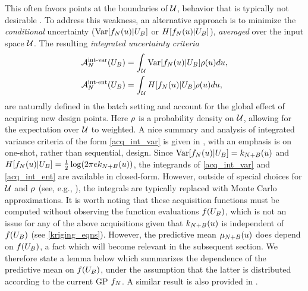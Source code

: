 \documentclass[12pt]{article}
\begin{document}
This often favors points at the boundaries of $\parSpace$, behavior that is typically not desirable \cite{gramacy2020surrogates}. 
To address this weakness, an alternative approach is to minimize the \textit{conditional} uncertainty 
($\Var[\funcEm[\Ndesign](\Par) | \designBatchIn]$ or $\Ent[\funcEm[\Ndesign](\Par) | \designBatchIn]$), \textit{averaged} over 
the input space $\parSpace$. The resulting \textit{integrated uncertainty criteria}
\begin{align}
\labelAcq[\Ndesign]{\intvarLabel}(\designBatchIn)
&= \int_{\parSpace} \Var[\funcEm[\Ndesign](\Par) | \designBatchIn] \weightDens(\Par) d\Par, \label{acq_int_var} \\ 
\labelAcq[\Ndesign]{\intentLabel}(\designBatchIn)
&= \int_{\parSpace} \Ent[\funcEm[\Ndesign](\Par) | \designBatchIn] \weightDens(\Par) d\Par, \label{acq_int_ent}
\end{align}
are naturally defined in the batch setting and account for the global effect of acquiring new design points. Here $\weightDens$ is 
a probability density on $\parSpace$, allowing for the expectation over $\parSpace$ to weighted. 
A nice summary and analysis of integrated variance criteria of the form \ref{acq_int_var} is given 
in \cite{Mercer_kernels_IVAR}, with an emphasis is on one-shot, rather than sequential, design. 
Since $\Var[\funcEm[\Ndesign](\Par) | \designBatchIn] = \gpKer[\Naugment](\Par)$ and 
$\Ent[\funcEm[\Ndesign](\Par) | \designBatchIn] = \frac{1}{2} \log(2\pi e \gpKer[\Naugment](\Par))$, the integrands of 
\ref{acq_int_var} and \ref{acq_int_ent} are available in closed-form. However, outside of special choices for $\parSpace$ and 
$\weightDens$ (see, e.g., \cite{Binois_2018}), the integrals are typically replaced with Monte Carlo approximations. It is worth noting that 
these acquisition functions must be computed without observing the function evaluations $\func(\designBatchIn)$, which is 
not an issue for any of the above acquisitions given that $\gpKer[\Naugment](\Par)$ is independent of $\func(\designBatchIn)$ 
(see \ref{kriging_eqns}). However, the predictive mean $\gpMean[\Naugment](\Par)$ does depend on $\func(\designBatchIn)$, 
a fact which will become relevant in the subsequent section. We therefore state a lemma below which summarizes the 
dependence of the predictive mean on $\func(\designBatchIn)$, under the assumption that the latter is distributed according 
to the current GP $\funcEm[\Ndesign]$. A similar result is also provided in \cite{VehtariParallelGP}. 
\end{document}
